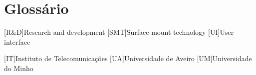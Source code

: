 \chapter{Glossário}

\footnotesize
\SingleSpacing

\begin{multicols}{2}
\begin{acronym}[AAAAAA]

	[R\&D]{Research and development}
	[SMT]{Surface-mount technology}
	[UI]{User interface}
	
	
	[IT]{Instituto de Telecomunicações}
	[UA]{Universidade de Aveiro}
	[UM]{Universidade do Minho}

\end{acronym}
\end{multicols}

